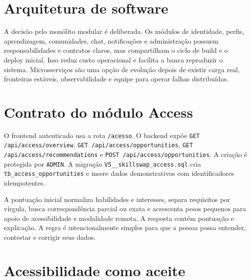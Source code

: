 \section{Arquitetura de software}

\begin{center}
\end{center}

A decisão pelo monólito modular é deliberada. Os módulos de identidade, perfis, aprendizagem, comunidades, chat, notificações e administração possuem responsabilidades e contratos claros, mas compartilham o ciclo de build e o deploy inicial. Isso reduz custo operacional e facilita a banca reproduzir o sistema. Microsserviços são uma opção de evolução depois de existir carga real, fronteiras estáveis, observabilidade e equipe para operar falhas distribuídas.

\section{Contrato do módulo Access}

O frontend autenticado usa a rota \texttt{/acesso}. O backend expõe \texttt{GET /api/access/overview}, \texttt{GET /api/access/opportunities}, \texttt{GET /api/access/recommendations} e \texttt{POST /api/access/opportunities}. A criação é protegida por \texttt{ADMIN}. A migração \texttt{V5\_\_skillswap\_access.sql} cria \texttt{tb\_access\_opportunities} e insere dados demonstrativos com identificadores idempotentes.

A pontuação inicial normaliza habilidades e interesses, separa requisitos por vírgula, busca correspondência parcial ou exata e acrescenta pesos pequenos para apoio de acessibilidade e modalidade remota. A resposta contém pontuação e explicação. A regra é intencionalmente simples para que a pessoa possa entender, contestar e corrigir seus dados.

\section{Acessibilidade como aceite}

